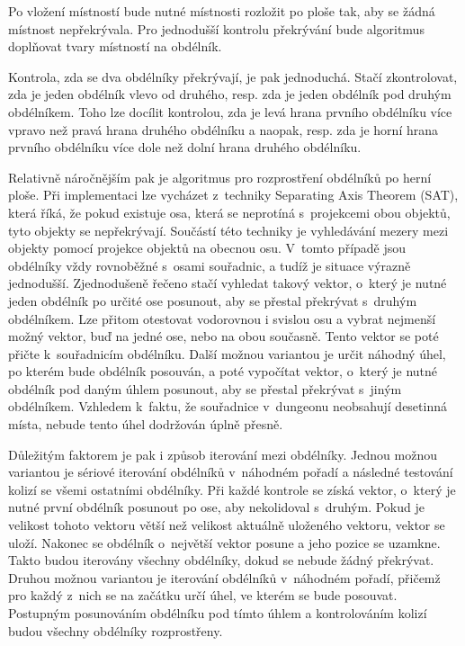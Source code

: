 Po vložení místností bude nutné místnosti rozložit po ploše tak, aby se žádná místnost nepřekrývala.
Pro jednodušší kontrolu překrývání bude algoritmus doplňovat tvary místností na obdélník.
\par
Kontrola, zda se dva obdélníky překrývají, je pak jednoduchá.
Stačí zkontrolovat, zda je jeden obdélník vlevo od druhého, resp. zda je jeden obdélník pod druhým obdélníkem.
Toho lze docílit kontrolou, zda je levá hrana prvního obdélníku více vpravo než pravá hrana druhého obdélníku a naopak, resp. zda je horní hrana prvního obdélníku více dole než dolní hrana druhého obdélníku.
\par
Relativně náročnějším pak je algoritmus pro rozprostření obdélníků po herní ploše.
Při implementaci lze vycházet z~techniky Separating Axis Theorem (SAT), která říká, že pokud existuje osa, která se neprotíná s~projekcemi obou objektů, tyto objekty se nepřekrývají\cite{lit:sep_axis_theorem}.
Součástí této techniky je vyhledávání mezery mezi objekty pomocí projekce objektů na obecnou osu.
V~tomto případě jsou obdélníky vždy rovnoběžné s~osami souřadnic, a tudíž je situace výrazně jednodušší.
Zjednodušeně řečeno stačí vyhledat takový vektor, o~který je nutné jeden obdélník po určité ose posunout, aby se přestal překrývat s~druhým obdélníkem.
Lze přitom otestovat vodorovnou i svislou osu a vybrat nejmenší možný vektor, buď na jedné ose, nebo na obou současně.
Tento vektor se poté přičte k~souřadnicím obdélníku.
Další možnou variantou je určit náhodný úhel, po kterém bude obdélník posouván, a poté vypočítat vektor, o~který je nutné obdélník pod daným úhlem posunout, aby se přestal překrývat s~jiným obdélníkem.
Vzhledem k~faktu, že souřadnice v~dungeonu neobsahují desetinná místa, nebude tento úhel dodržován úplně přesně.
\par
Důležitým faktorem je pak i způsob iterování mezi obdélníky.
Jednou možnou variantou je sériové iterování obdélníků v~náhodném pořadí a následné testování kolizí se všemi ostatními obdélníky.
Při každé kontrole se získá vektor, o~který je nutné první obdélník posunout po ose, aby nekolidoval s~druhým.
Pokud je velikost tohoto vektoru větší než velikost aktuálně uloženého vektoru, vektor se uloží.
Nakonec se obdélník o~největší vektor posune a jeho pozice se uzamkne.
Takto budou iterovány všechny obdélníky, dokud se nebude žádný překrývat.
Druhou možnou variantou je iterování obdélníků v~náhodném pořadí, přičemž pro každý z~nich se na začátku určí úhel, ve kterém se bude posouvat.
Postupným posunováním obdélníku pod tímto úhlem a kontrolováním kolizí budou všechny obdélníky rozprostřeny.
